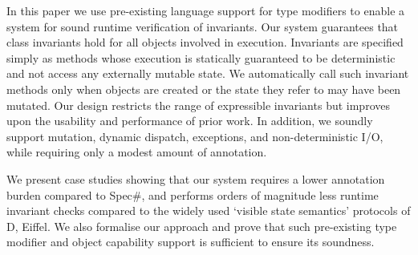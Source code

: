 In this paper we use pre-existing language support for type modifiers to enable a system for sound runtime verification of invariants.
Our system guarantees that class invariants hold for all objects involved in execution.
Invariants are specified simply as methods whose execution is statically guaranteed to be deterministic and not access any externally mutable state.
We automatically call such invariant methods only when objects are created or the state they refer to may have been mutated.
Our design restricts the range of expressible invariants but improves upon the usability and performance of prior work.
In addition, we soundly support mutation, dynamic dispatch, exceptions, and non-deterministic I/O, while requiring only a modest amount of annotation.

We present case studies showing that our system requires a lower annotation burden compared to Spec\#, and  performs orders of magnitude less runtime invariant checks compared to the widely used `visible state semantics' protocols of D, Eiffel.
We also formalise our approach and prove that such pre-existing type modifier and object capability support is sufficient to ensure its soundness. %